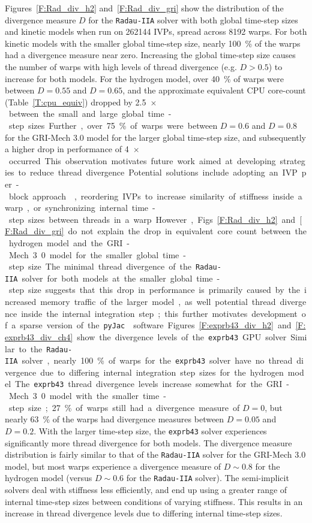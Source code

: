 \documentclass[preprint,review,11pt]{elsarticle}
\begin{document}
Figures~\ref{F:Rad_div_h2} and~\ref{F:Rad_div_gri} show the distribution of the divergence measure $D$ for the \texttt{Radau-IIA} solver with both global time-step sizes and kinetic models when run on \num{262144} IVPs, spread across \num{8192} warps.
For both kinetic models with the smaller global time-step size, nearly \SI{100}{\percent} of the warps had a divergence measure near zero.
Increasing the global time-step size causes the number of warps with high levels of thread divergence (e.g. $D > 0.5$) to increase for both models.
For the hydrogen model, over \SI{40}{\percent} of warps were between $D=0.55$ and $D=0.65$, and the approximate equivalent CPU core-count (Table~\ref{T:cpu_equiv}) dropped by \SI{2.5}{$\times$} between the small and large global time-step sizes.
Further, over \SI{75}{\percent} of warps were between $D=0.6$ and $D=0.8$ for the GRI-Mech 3.0 model for the larger global time-step size, and subsequently a higher drop in performance of \SI{4}{$\times$} occurred.
This observation motivates future work aimed at developing strategies to reduce thread divergence.
Potential solutions include adopting an IVP per-block approach~\cite{Stone:2013aa}, reordering IVPs to increase similarity of stiffness inside a warp, or synchronizing internal time-step sizes between threads in a warp.
However, Figs.~\ref{F:Rad_div_h2} and \ref{F:Rad_div_gri} do not explain the drop in equivalent core count between the hydrogen model and the GRI-Mech 3.0 model for the smaller global time-step size.
The minimal thread divergence of the \texttt{Radau-IIA} solver for both models at the smaller global time-step size suggests that this drop in performance is primarily caused by the increased memory traffic of the larger model, as well potential thread divergence inside the internal integration step; this further motivates development of a sparse version of the \texttt{pyJac}~\cite{niemeyer_2016_51139,Niemeyer:2016aa} software.

Figures~\ref{F:exprb43_div_h2} and \ref{F:exprb43_div_ch4} show the divergence levels of the \texttt{exprb43} GPU solver.
Similar to the \texttt{Radau-IIA} solver, nearly \SI{100}{\percent} of warps for the \texttt{exprb43} solver have no thread divergence due to differing internal integration step sizes for the hydrogen model.
The \texttt{exprb43} thread divergence levels increase somewhat for the GRI-Mech 3.0 model with the smaller time-step size; \SI{27}{\percent} of warps still had a divergence measure of $D=0$, but nearly \SI{63}{\percent} of the warps had divergence measures between $D=0.05$ and $D=0.2$.
With the larger time-step size, the \texttt{exprb43} solver experiences significantly more thread divergence for both models.
The divergence measure distribution is fairly similar to that of the \texttt{Radau-IIA} solver for the GRI-Mech 3.0 model, but most warps experience a divergence measure of $D \sim 0.8$ for the hydrogen model (versus $D \sim 0.6$ for the \texttt{Radau-IIA} solver).
The semi-implicit solvers deal with stiffness less efficiently, and end up using a greater range of internal time-step sizes between conditions of varying stiffness.
This results in an increase in thread divergence levels due to differing internal time-step sizes.
\end{document}
